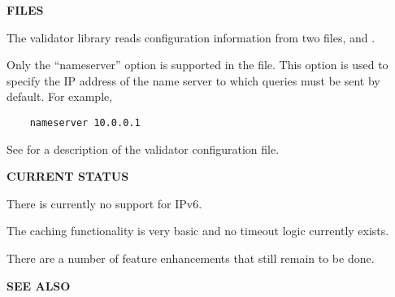 {\bf FILES}

The validator library reads configuration information from two files,
 and .

Only the ``nameserver'' option is supported in the  file.
This option is used to specify the IP address of the name server to which
queries must be sent by default.  For example,

\begin{verbatim}
    nameserver 10.0.0.1
\end{verbatim}

See  for a description of the validator configuration file.

{\bf CURRENT STATUS}

There is currently no support for IPv6.

The caching functionality is very basic and no timeout logic currently exists.

There are a number of feature enhancements that still remain to be done.

{\bf SEE ALSO}


